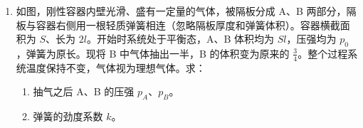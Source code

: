 \documentclass[\gkver]{gaokaozhenti}
\begin{document}
\begin{enumerate}
{$R_{A} = \frac{U}{I} = \frac{0.60}{0.58} \UO \approx 1.0 \UO$

②由闭合电路欧姆定律可知，干电池电动势的表达式为

$E = U + I(r + R_{A})$

③根据 $E = U + I(r + R_{A})$ 变形为

$U = -(r + R_{A})I + E$

根据图像可知，纵截距 $b = E = 1.40 \UV$

斜率的绝对值

$\left|k\right| = r + R_{A} = \frac{1.40 - 1.00}{0.20 - 0} \UO = 2.0 \UO$

所以待测干电池电动势为 $E = 1.40 \UV$，电源内阻为 $r = 1.0 \UO$

（2）由于将电压表串联接在电路中，电压表内阻很大，电路中电流太小，故无法完成实验的原因可能是电流太小无法读数。

故选 D。
}

\item
如图，刚性容器内壁光滑、盛有一定量的气体，被隔板分成 A、B 两部分，隔板与容器右侧用一根轻质弹簧相连（忽略隔板厚度和弹簧体积）。容器横截面积为 $S$、长为 $2l$。开始时系统处于平衡态，A、B 体积均为 $Sl$，压强均为 $p_{0}$，弹簧为原长。现将 B 中气体抽出一半，B 的体积变为原来的 $\frac{3}{4}$。整个过程系统温度保持不变，气体视为理想气体。求：
\begin{enumerate}
	\item
	抽气之后 A、B 的压强 $p_{A}$、$p_{B}$。
	\item
	弹簧的劲度系数 $k$。
\end{enumerate}

\end{enumerate}
\end{document}
